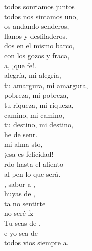 \documentclass[12pt]{article}
\begin{document}
\begin{multicols*}{2}
\begin{cancion}%
	 todos sonriamos juntos\\
todos nos sintamos uno,\\
	os andando senderos,\\
llanos y desfiladeros.\\
	dos en el mismo barco,\\
	con los gozos y fraca,\\
	a, ¡que fe!. \\
	alegría, mi alegría,\\
tu amargura, mi amargura,\\
	pobreza, mi pobreza,\\
tu riqueza, mi riqueza,\\
	 camino, mi camino,\\
	tu destino, mi destino,\\
	he de senr.\\
	mi alma sto,\\
	¡esa es felicidad!\\
	rdo hasta el aliento\\
	al pen lo que será.\\
	, sabor a ,\\
	 huyas de ,\\
	ta no sentirte\\
	no seré fz\\
	 Tu seas de ,\\
	e yo sea de \\
	 todos vios siempre a.\\
\end{cancion}%


\end{multicols*}
\end{document}
